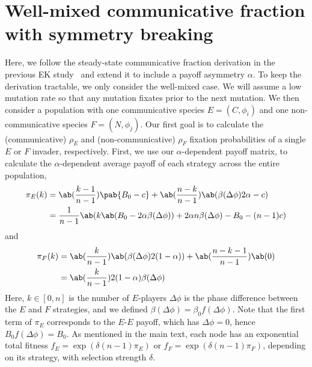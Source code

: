 \documentclass[pdflatex,sn-nature,super]{sn-jnl}
\begin{document}
\section{Well-mixed communicative fraction with symmetry breaking}\label{sec:analytic_comm_frac}
Here, we follow the steady-state communicative fraction derivation
in the previous EK study~\citep{tripp2022evolutionary}
and extend it to include a payoff asymmetry $\alpha$.
To keep the derivation tractable,
we only consider the well-mixed case.
We will assume a low mutation rate
so that any mutation fixates prior to the next mutation.
We then consider a population with one communicative species $E = (C, \phi_i)$
and one non-communicative species $F = (N, \phi_j)$.
Our first goal is to calculate
the (communicative) $\rho_E$ and (non-communicative) $\rho_F$
fixation probabilities of a single $E$ or $F$ invader, respectively.
First, we use our $\alpha$-dependent payoff matrix,
to calculate the $\alpha$-dependent average payoff
of each strategy across the entire population,
\begin{align}
  \pi_E(k) &= \ab(\frac{k-1}{n-1}) \pab{B_0 - c}
                + \ab(\frac{n-k}{n-1}) \ab(\beta(\Delta\phi) 2\alpha - c) \\
           &= \frac{1}{n-1}
               \ab(k \ab(B_0 - 2 \alpha \beta(\Delta\phi))
                 + 2 \alpha n \beta(\Delta\phi) - B_0 - (n-1) c)
\end{align}
and
\begin{align}
  \pi_F(k) &= \ab(\frac{k}{n-1}) \ab(\beta(\Delta\phi) 2 (1-\alpha))
                + \ab(\frac{n-k-1}{n-1}) \ab(0) \\
           &= \ab(\frac{k}{n-1}) 2 (1-\alpha) \beta(\Delta\phi)
\end{align}
Here, $k \in [0,n]$ is the number of $E$-players
$\Delta \phi$ is the phase difference between the $E$ and $F$
strategies,
and we defined $\beta(\Delta \phi) = \beta_0 f(\Delta \phi)$.
Note that the first term of $\pi_E$ corresponds
to the $E$-$E$ payoff, which has $\Delta \phi = 0$,
hence $B_0 f(\Delta \phi) = B_0$.
As mentioned in the main text,
each node has an exponential total fitness
$f_E = \exp(\delta (n-1) \pi_E)$
or
$f_F = \exp(\delta (n-1) \pi_F)$,
depending on its strategy,
with selection strength $\delta$.
\end{document}
